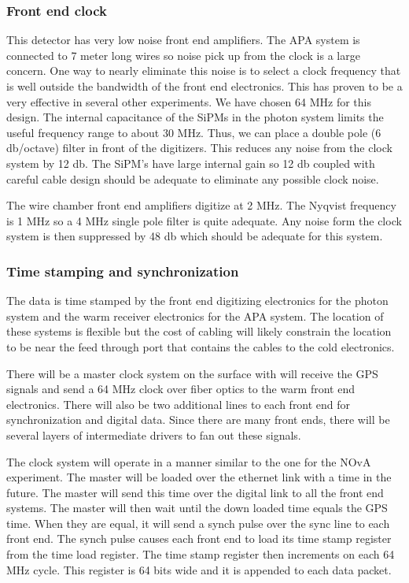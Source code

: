 \subsubsection{Front end clock}

This detector has very low noise front end amplifiers.  The APA system
is connected to 7 meter long wires so noise pick up from the clock is
a large concern.  One way to nearly eliminate this noise is to select
a clock frequency that is well outside the bandwidth of the front end
electronics.  This has proven to be a very effective in several other
experiments.  We have chosen 64 MHz for this design.  The internal
capacitance of the SiPMs in the photon system limits the useful
frequency range to about 30 MHz.  Thus, we can place a double pole (6
db/octave) filter in front of the digitizers. This reduces any noise
from the clock system by 12 db.  The SiPM’s have large internal gain
so 12 db coupled with careful cable design should be adequate to
eliminate any possible clock noise.

The wire chamber front end amplifiers digitize at 2 MHz.  The Nyqvist
frequency is 1 MHz so a 4 MHz single pole filter is quite adequate.
Any noise form the clock system is then suppressed by 48 db which
should be adequate for this system.

\subsubsection{Time stamping and synchronization}

The data is time stamped by the front end digitizing electronics for
the photon system and the warm receiver electronics for the APA
system.  The location of these systems is flexible but the cost of
cabling will likely constrain the location to be near the feed through
port that contains the cables to the cold electronics.

There will be a master clock system on the surface with will receive
the GPS signals and send a 64 MHz clock over fiber optics to the warm
front end electronics. There will also be two additional lines to each
front end for synchronization and digital data.  Since there are many
front ends, there will be several layers of intermediate drivers to
fan out these signals.

The clock system will operate in a manner similar to the one for the
NOvA experiment.  The master will be loaded over the ethernet link
with a time in the future.  The master will send this time over the
digital link to all the front end systems.  The master will then wait
until the down loaded time equals the GPS time.  When they are equal,
it will send a synch pulse over the sync line to each front end.  The
synch pulse causes each front end to load its time stamp register from
the time load register.  The time stamp register then increments on
each 64 MHz cycle.  This register is 64 bits wide and it is appended
to each data packet.

